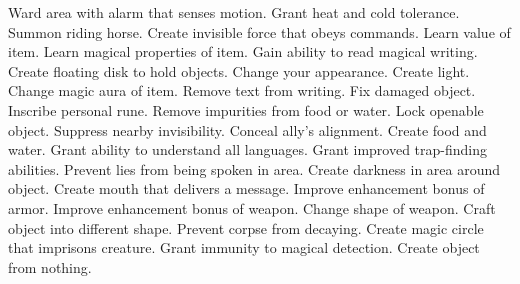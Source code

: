     {Ward area with alarm that senses motion.}
    {Grant heat and cold tolerance.}
    {Summon riding horse.}
    {Create invisible force that obeys commands.}
    {Learn value of item.}
    {Learn magical properties of item.}
    {Gain ability to read magical writing.}
    {Create floating disk to hold objects.}
    {Change your appearance.}
    {Create light.}
    {Change magic aura of item.}
    {Remove text from writing.}
    {Fix damaged object.}
    {Inscribe personal rune.}
    {Remove impurities from food or water.}
    {Lock openable object.}
    {Suppress nearby invisibility.}
    {Conceal ally's alignment.}
    {Create food and water.}
    {Grant ability to understand all languages.}
    {Grant improved trap-finding abilities.}
    {Prevent lies from being spoken in area.}
    {Create darkness in area around object.}
    {Create mouth that delivers a message.}
    {Improve enhancement bonus of armor.}
    {Improve enhancement bonus of weapon.}
    {Change shape of weapon.}
    {Craft object into different shape.}
    {Prevent corpse from decaying.}
    {Create magic circle that imprisons creature.}
    {Grant immunity to magical detection.}
    {Create object from nothing.}
